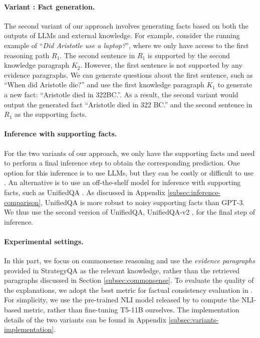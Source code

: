 \paragraph{Variant \uppercase\expandafter{}: Fact generation.} The second variant of our approach involves generating facts based on both the outputs of LLMs and external knowledge. For example, consider the running example of ``\textit{Did Aristotle use a laptop?}'', where we only have access to the first reasoning path $R_1$. The second sentence in $R_1$ is supported by the second knowledge paragraph $K_2$. However, the first sentence is not supported by any evidence paragraphs. We can generate questions about the first sentence, such as ``When did Aristotle die?'' and use the first knowledge paragraph $K_1$ to generate a new fact: ``Aristotle died in 322BC.''. As a result, the second variant would output the generated fact ``Aristotle died in 322 BC.'' and the second sentence in $R_1$ as the supporting facts.

\paragraph{Inference with supporting facts.} For the two variants of our approach, we only have the supporting facts and need to perform a final inference step to obtain the corresponding prediction. One option for this inference is to use LLMs, but they can be costly \cite{brown2020language} or difficult to use \cite{zhang2022opt}. An alternative is to use an off-the-shelf model for inference with supporting facts, such as UnifiedQA \cite{khashabi2020unifiedqa, khashabi2022unifiedqa}. As discussed in Appendix \ref{subsec:inference-comparison}, UnifiedQA is more robust to noisy supporting facts than GPT-3. We thus use the second version of UnifiedQA, UnifiedQA-v2 \cite{khashabi2022unifiedqa}, for the final step of inference.

\paragraph{Experimental settings.} In this part, we focus on commonsense reasoning and use the \textit{evidence paragraphs} provided in StrategyQA as the relevant knowledge, rather than the retrieved paragraphs discussed in Section \ref{subsec:commonsense}. To evaluate the quality of the explanations, we adopt the best metric for factual consistency evaluation in \citet{honovich2022true}. For simplicity, we use the pre-trained NLI model released by \citet{nie2020adversarial} to compute the NLI-based metric, rather than fine-tuning T5-11B \cite{raffel2020exploring} ourselves. The implementation details of the two variants can be found in Appendix \ref{subsec:variants-implementation}.

